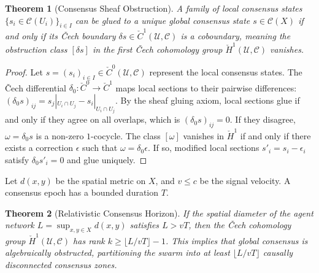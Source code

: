 \documentclass[11pt,oneside]{book}
\theoremstyle{definition}
\theoremstyle{plain}
\newtheorem{theorem}{Theorem}[chapter]
\theoremstyle{remark}
\begin{document}
\begin{theorem}[Consensus Sheaf Obstruction]\label{thm:consensus_obstruction}
A family of local consensus states $\{s_i \in \mathcal{C}(U_i)\}_{i \in I}$ can be glued to a unique global consensus state $s \in \mathcal{C}(X)$ if and only if its Čech boundary $\delta s \in \check{C}^1(\mathcal{U}, \mathcal{C})$ is a coboundary, meaning the obstruction class $[\delta s]$ in the first Čech cohomology group $\check{H}^1(\mathcal{U}, \mathcal{C})$ vanishes. %
\end{theorem}

\begin{proof}
Let $s = (s_i)_{i \in I} \in \check{C}^0(\mathcal{U}, \mathcal{C})$ represent the local consensus states. %
The Čech differential $\delta_0: \check{C}^0 \to \check{C}^1$ maps local sections to their pairwise differences: $(\delta_0 s)_{ij} = s_j|_{U_i \cap U_j} - s_i|_{U_i \cap U_j}$. %
By the sheaf gluing axiom, local sections glue if and only if they agree on all overlaps, which is $(\delta_0 s)_{ij} = 0$. %
If they disagree, $\omega = \delta_0 s$ is a non-zero $1$-cocycle. %
The class $[\omega]$ vanishes in $\check{H}^1$ if and only if there exists a correction $\epsilon$ such that $\omega = \delta_0 \epsilon$. %
If so, modified local sections $s'_i = s_i - \epsilon_i$ satisfy $\delta_0 s'_i = 0$ and glue uniquely. %
\end{proof}

Let $d(x,y)$ be the spatial metric on $X$, and $v \le c$ be the signal velocity. %
A consensus epoch has a bounded duration $T$. %

\begin{theorem}[Relativistic Consensus Horizon]\label{thm:relativistic_horizon}
If the spatial diameter of the agent network $L = \sup_{x,y \in X} d(x,y)$ satisfies $L > v T$, then the Čech cohomology group $\check{H}^1(\mathcal{U}, \mathcal{C})$ has rank $k \ge \lfloor L / v T \rfloor - 1$. %
This implies that global consensus is algebraically obstructed, partitioning the swarm into at least $\lfloor L / v T \rfloor$ causally disconnected consensus zones. %
\end{theorem}
\end{document}
